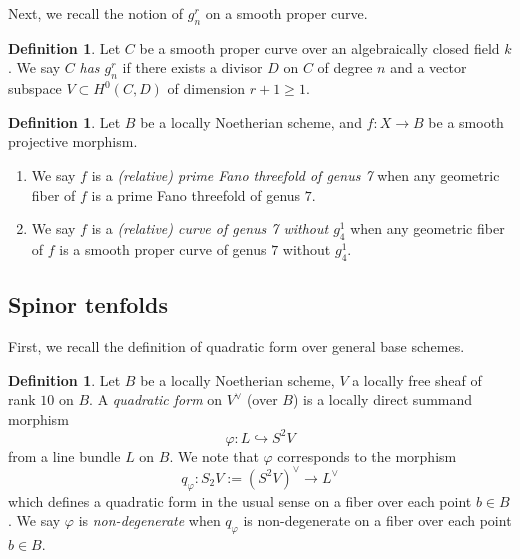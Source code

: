 \documentclass[autodetect-engine, a4paper]{amsart}
\theoremstyle{definition}
\newtheorem{defn}[thm]{Definition}
\newcommand{\cred}{\color{black}}
\begin{document}
Next, we recall the notion of $g_n^r$ on a smooth proper curve.
\begin{defn}
Let $C$ be a smooth proper curve over an algebraically closed field $k$.
We say $C$ \emph{has $g_n^r$} if there exists a divisor $D$ on $C$ of degree $n$ and a vector subspace $V \subset H^0(C,D)$ of dimension $r+1 \geq 1$.
\end{defn}


\begin{defn}
\label{defn:family}
Let $B$ be a locally Noetherian scheme, and $f \colon X \rightarrow B$ be a smooth projective morphism.
\begin{enumerate}
\item 
We say $f$ is a \emph{(relative) prime Fano threefold of genus 7} when any geometric fiber of $f$ is a prime Fano threefold of genus $7$.
\item 
We say $f$ is a \emph{(relative) curve of genus 7 without $g_4^1$} when any geometric fiber of $f$ is a smooth proper curve of genus $7$ without $g_4^1$.
\end{enumerate}
\end{defn}

\subsection{Spinor tenfolds}
\label{subsection:spin10}

First, we recall the definition of quadratic form over general base schemes.

\begin{defn}
{\cred Let $B$ be a locally Noetherian scheme, 
$V$ a locally free sheaf of rank $10$ on $B$.
A \emph{quadratic form} on $V^{\vee}$ (over $B$) is a locally direct summand morphism
\[
\varphi \colon L \hookrightarrow S^2 V
\]
from a line bundle $L$ on $B$.
We note that $\varphi$ corresponds to the morphism 
\[
q_{\varphi} \colon S_{2} V := (S^2 V)^{\vee} \rightarrow L^{\vee}
\]
which defines a quadratic form in the usual sense on a fiber over each point $b \in B$.
We say $\varphi$ is \emph{non-degenerate} when $q_{\varphi}$ is non-degenerate on a fiber over each point $b \in B$.
}
\end{defn}
\end{document}
